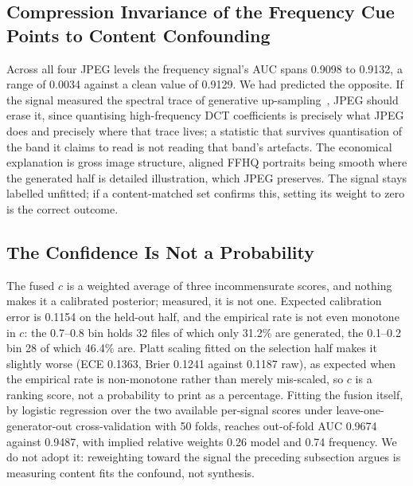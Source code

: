 \documentclass[conference]{IEEEtran}
\begin{document}
\subsection{Compression Invariance of the Frequency Cue Points to Content
Confounding}
\label{sec:freq}

Across all four JPEG levels the frequency signal's AUC spans 0.9098 to 0.9132,
a range of 0.0034 against a clean value of 0.9129. We had predicted the
opposite. If the signal measured the spectral trace of generative
up-sampling~\cite{durall2020,frank2020}, JPEG should erase it, since
quantising high-frequency DCT coefficients is precisely what JPEG does and
precisely where that trace lives; a statistic that survives quantisation of the
band it claims to read is not reading that band's artefacts. The economical
explanation is gross image structure, aligned FFHQ portraits being smooth where
the generated half is detailed illustration, which JPEG preserves. The signal
stays labelled unfitted; if a content-matched set confirms this, setting its
weight to zero is the correct outcome.

\subsection{The Confidence Is Not a Probability}
\label{sec:calib}

The fused $c$ is a weighted average of three incommensurate scores, and
nothing makes it a calibrated posterior; measured, it is not one. Expected
calibration error is 0.1154 on the held-out half, and the empirical rate is not
even monotone in $c$: the 0.7--0.8 bin holds 32 files of which only 31.2\% are
generated, the 0.1--0.2 bin 28 of which 46.4\% are. Platt scaling fitted on
the selection half makes it slightly worse (ECE 0.1363, Brier 0.1241 against
0.1187 raw), as expected when the empirical rate is non-monotone rather than
merely mis-scaled, so $c$ is a ranking score, not a probability to print as a
percentage. Fitting the fusion itself, by logistic regression over the two
available per-signal scores under leave-one-generator-out cross-validation
with 50 folds, reaches out-of-fold AUC 0.9674 against 0.9487, with implied
relative weights 0.26 model and 0.74 frequency. We do not adopt it: reweighting
toward the signal the preceding subsection argues is measuring content fits the
confound, not synthesis.
\end{document}
